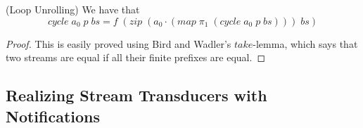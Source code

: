 \begin{lemma}{(Loop Unrolling)} We have that 
  \begin{displaymath}
    cycle\;a_0\;p\;bs = f\;(zip\;(a_0\cdot(map\;\pi_1\;(cycle\;a_0\;p\;bs)))\;bs)
  \end{displaymath}
\end{lemma}

\begin{proof}
  This is easily proved using Bird and Wadler's $take$-lemma, which
  says that two streams are equal if all their finite prefixes are
  equal.
\end{proof}


\subsection{Realizing Stream Transducers with Notifications}

